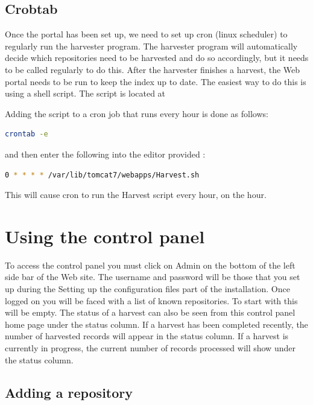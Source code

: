 \documentclass[a4paper,11pt]{article}
\begin{document}
\subsection{Crobtab}

Once the portal has been set up, we need to set up cron (linux scheduler) to regularly run the harvester program. The harvester program will automatically decide which repositories need to be harvested and do so accordingly, but it needs to be called regularly to do this. After the harvester finishes a harvest, the Web portal needs to be run to keep the index up to date. The easiest way to do this is using a shell script. The script is located at 

Adding the script to a cron job that runs every hour is done as follows: 

\begin{lstlisting}[language=bash]
 crontab -e
\end{lstlisting}

and then enter the following into the editor provided : 

\begin{lstlisting}[language=bash]
 0 * * * * /var/lib/tomcat7/webapps/Harvest.sh
\end{lstlisting}

This will cause cron to run the Harvest script every hour, on the hour.

\section{Using the control panel}

To access the control panel you must click on Admin on the bottom of the left side bar of the Web site. The username and password will be those that you set up during the Setting up the configuration files part of the installation. Once logged on you will be faced with a list of known repositories. To start with this will be empty. The status of a harvest can also be seen from this control panel home page under the status column. If a harvest has been completed recently, the number of harvested records will appear in the status column. If a harvest is currently in progress, the current number of records processed will show under the status column.

\subsection{Adding a repository}
\end{document}
